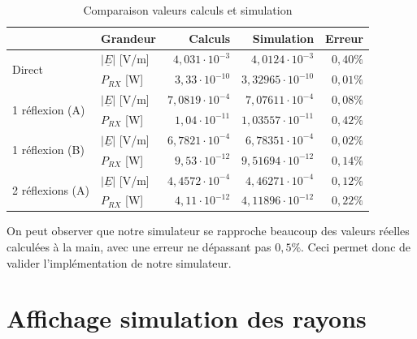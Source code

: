 \begin{table}[H]
    \centering
    \begin{tabular}{|l|l|r|r|r|}
         \hline
                                  & Grandeur & Calculs & Simulation & Erreur \\
        \hline
\multirow{2}{*}{Direct}           & $\left|\underline{E}\right|$ [V/m] & $4,031\cdot10^{-3}$ & $4,0124\cdot10^{-3}$ & $0,40\%$ \\
                                  & $P_{RX}$ [W] & $3,33\cdot10^{-10}$  & $3,32965\cdot10^{-10}$ & $0,01\%$     \\
        \hline
\multirow{2}{*}{1 réflexion (A)}  & $\left|\underline{E}\right|$ [V/m] & $7,0819\cdot10^{-4}$ & $7,07611\cdot10^{-4}$ & $0,08\%$ \\
                                  & $P_{RX}$ [W] & $1,04\cdot10^{-11}$ & $1,03557\cdot10^{-11}$ & $0,42\%$ \\
        \hline
\multirow{2}{*}{1 réflexion (B)}  & $\left|\underline{E}\right|$ [V/m] & $6,7821\cdot10^{-4}$ & $6,78351\cdot10^{-4}$ & $0,02\%$ \\
                                  & $P_{RX}$ [W] & $9,53\cdot10^{-12}$ & $9,51694\cdot10^{-12}$ & $0,14\%$ \\
        \hline
\multirow{2}{*}{2 réflexions (A)} & $\left|\underline{E}\right|$ [V/m] & $4,4572\cdot10^{-4}$ & $4,46271\cdot10^{-4}$ & $0,12\%$ \\
                                  & $P_{RX}$ [W] & $4,11\cdot10^{-12}$ & $4,11896\cdot10^{-12}$ & $0,22\%$ \\
        \hline
    \end{tabular}
    \caption{Comparaison valeurs calculs et simulation}
    \label{tab:comparaison-calculs-simulation}
\end{table}

On peut observer que notre simulateur se rapproche beaucoup des valeurs réelles calculées à la main, avec une erreur ne dépassant pas $0,5\%$. Ceci permet donc de valider l'implémentation de notre simulateur.\\


\section{Affichage simulation des rayons}

